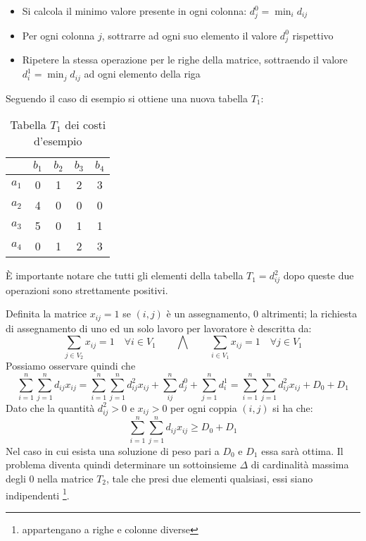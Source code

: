 \documentclass[../template]{subfiles}
\begin{document}
\begin{itemize}
    \item Si calcola il minimo valore presente in ogni colonna: $d^0_j = \min_i d_{ij}$
    \item Per ogni colonna $j$, sottrarre ad ogni suo elemento il valore $d^0_j$ rispettivo
    \item Ripetere la stessa operazione per le righe della matrice, sottraendo il valore $d^1_i = \min_j d_{ij}$ ad ogni
        elemento della riga
\end{itemize}
Seguendo il caso di esempio si ottiene una nuova tabella $T_1$:

\begin{table}[h]
    \centering
    \begin{tabular}{|c|cccc|}
        \hline
    & $b_1$ & $b_2$ & $b_3$ & $b_4$\\
    \hline
        $a_1$ & 0 & 1 & 2 & 3\\
        $a_2$ & 4 & 0 & 0 & 0\\
        $a_3$ & 5 & 0 & 1 & 1\\
        $a_4$ & 0 & 1 & 2 & 3\\
        \hline
    \end{tabular}
    \caption{Tabella $T_1$ dei costi d'esempio}
    \label{tab:hungarian_example_t1}
\end{table}

\setlength\parindent{0em}
\setlength\parskip{1em}

È importante notare che tutti gli elementi della tabella $T_1 = d_{ij}^2$ dopo queste due operazioni sono strettamente positivi.

Definita la matrice $x_{ij} = 1$ se $(i, j)$ è un assegnamento, 0 altrimenti; la richiesta di assegnamento di uno ed un
solo lavoro per lavoratore è descritta da:
\[
    \sum_{j \in V_2} x_{ij} = 1 \quad \forall i \in V_1 \qquad
    \bigwedge\qquad
    \sum_{i \in V_1} x_{ij} = 1 \quad \forall j \in V_1
\]
Possiamo osservare quindi che
\[
    \sum^n_{i = 1} \sum^n_{j=1} d_{ij} x_{ij} = \sum^n_{i=1}\sum^n_{j=1} d_{ij}^2 x_{ij} + \sum_{ij}^n d_j^0 +
    \sum^n_{j=1} d_i^1 = \sum^n_{i=1}\sum^n_{j=1} d_{ij}^2 x_{ij} + D_0 + D_1
\]
Dato che la quantità $d_{ij}^2 > 0$ e $x_{ij} > 0$ per ogni coppia $(i, j)$ si ha che:
\[
    \sum^n_{i=1}\sum^n_{j=1} d_{ij} x_{ij}  \ge D_0 + D_1
\]
Nel caso in cui esista una soluzione di peso pari a $D_0$ e $D_1$ essa sarà ottima.
Il problema diventa quindi determinare un sottoinsieme $\Delta$ di cardinalità massima degli 0 nella matrice $T_2$, tale
che presi due elementi qualsiasi, essi siano indipendenti \footnote{appartengano a righe e colonne diverse}.
\end{document}
